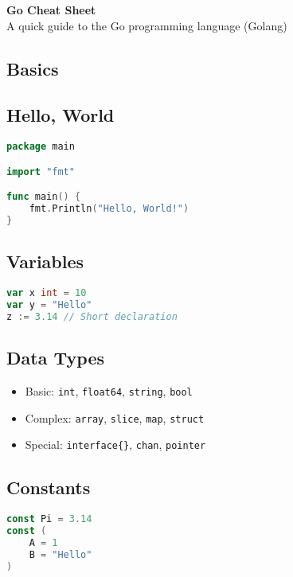 \documentclass[a4paper,10pt]{article}
\begin{document}
\begin{center}
  {\LARGE \textbf{Go Cheat Sheet}} \\[1em]
  {\large A quick guide to the Go programming language (Golang)}
\end{center}

\vspace{0.5cm}

\begin{multicols*}{2}

\section{Basics}
\subsection{Hello, World}
\begin{lstlisting}[language=Go]
package main

import "fmt"

func main() {
    fmt.Println("Hello, World!")
}
\end{lstlisting}

\subsection{Variables}
\begin{lstlisting}[language=Go]
var x int = 10
var y = "Hello"
z := 3.14 // Short declaration
\end{lstlisting}

\subsection{Data Types}
\begin{itemize}
  \item Basic: \texttt{int}, \texttt{float64}, \texttt{string}, \texttt{bool}
  \item Complex: \texttt{array}, \texttt{slice}, \texttt{map}, \texttt{struct}
  \item Special: \texttt{interface\{\}}, \texttt{chan}, \texttt{pointer}
\end{itemize}

\subsection{Constants}
\begin{lstlisting}[language=Go]
const Pi = 3.14
const (
    A = 1
    B = "Hello"
)
\end{lstlisting}


\end{multicols*}
\end{document}
